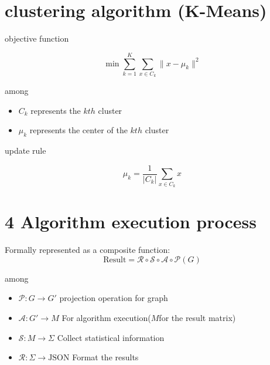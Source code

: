 \documentclass{article}
\begin{document}
\section{ clustering algorithm (K-Means)}

objective function 

\begin{equation}
\min \sum_{k=1}^K \sum_{x \in C_k} \|x - \mu_k\|^2
\end{equation}

among

\begin{itemize}
    \item $C_k$ represents the  $kth$ cluster 
    \item $\mu_k$ represents the center of the  $kth$ cluster 
\end{itemize}



update rule 

\begin{equation}
\mu_k = \frac{1}{|C_k|} \sum_{x \in C_k} x
\end{equation}

\section*{4       Algorithm execution process}


Formally represented as a composite function:
\begin{equation}
\text{Result} = \mathcal{R} \circ \mathcal{S} \circ \mathcal{A} \circ \mathcal{P}(G)
\end{equation}

among

\begin{itemize}
    \item $\mathcal{P}: G \rightarrow G'$ projection operation for graph
    \item $\mathcal{A}: G' \rightarrow M$ For algorithm execution($M$for the result matrix)
    \item $\mathcal{S}: M \rightarrow \Sigma$ Collect statistical information
    \item $\mathcal{R}: \Sigma \rightarrow \text{JSON}$ Format the results
\end{itemize}
\end{document}
